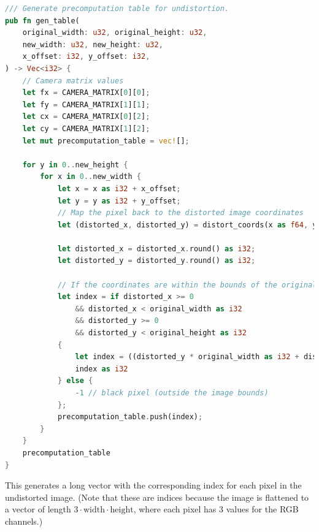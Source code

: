 \begin{lstlisting}[language=rust,breaklines,label={lst:gen_table}]
/// Generate precomputation table for undistortion.
pub fn gen_table(
    original_width: u32, original_height: u32,
    new_width: u32, new_height: u32,
    x_offset: i32, y_offset: i32,
) -> Vec<i32> {
    // Camera matrix values
    let fx = CAMERA_MATRIX[0][0];
    let fy = CAMERA_MATRIX[1][1];
    let cx = CAMERA_MATRIX[0][2];
    let cy = CAMERA_MATRIX[1][2];
    let mut precomputation_table = vec![];

    for y in 0..new_height {
        for x in 0..new_width {
            let x = x as i32 + x_offset;
            let y = y as i32 + y_offset;
            // Map the pixel back to the distorted image coordinates
            let (distorted_x, distorted_y) = distort_coords(x as f64, y as f64, fx, fy, cx, cy);

            let distorted_x = distorted_x.round() as i32;
            let distorted_y = distorted_y.round() as i32;

            // If the coordinates are within the bounds of the original image, map the pixel
            let index = if distorted_x >= 0
                && distorted_x < original_width as i32
                && distorted_y >= 0
                && distorted_y < original_height as i32
            {
                let index = ((distorted_y * original_width as i32 + distorted_x) * 3) as usize;
                index as i32
            } else {
                -1 // black pixel (outside the image bounds)
            };
            precomputation_table.push(index);
        }
    }
    precomputation_table
}
\end{lstlisting}
This generates a long vector with the corresponding index for each pixel in the undistorted image.
(Note that these are indices because the image is flattened to a vector of length $3 \cdot \text{width} \cdot \text{height}$, where each pixel has 3 values for the RGB channels.)


